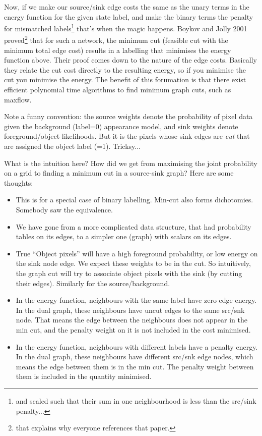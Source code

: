 \documentclass{article}
\begin{document}
Now, if we make our source/sink edge costs the same as the unary terms in the
energy function for the given state label, and make the binary terms the penalty
for mismatched labels\footnote{and scaled such that their sum in one
  neighbourhood is less than the src/sink penalty...} that's when the magic
happens.  Boykov and Jolly 2001 proved\footnote{that explains why everyone
  references that paper.} that for such a network, the minimum cut (feasible cut
with the minimum total edge cost) results in a labelling that minimises the
energy function above.  Their proof comes down to the nature of the edge costs.
Basically they relate the cut cost directly to the resulting energy, so if you
minimise the cut you minimise the energy.  The benefit of this forumation is
that there exist efficient polynomial time algorithms to find minimum graph
cuts, such as maxflow.

Note a funny convention: the source weights denote the probability of pixel data
given the background (label=0) appearance model, and sink weights denote
foreground/object likelihoods.  But it is the pixels whose sink edges are {\em
  cut} that are assigned the object label (=1).  Tricksy...

What is the intuition here?  How did we get from maximising the joint
probability on a grid to finding a minimum cut in a source-sink graph?  Here are
some thoughts:
\begin{itemize}
\item This is for a special case of binary labelling.  Min-cut also forms
  dichotomies.  Somebody saw the equivalence.
\item We have gone from a more complicated data structure, that had probability
  tables on its edges, to a simpler one (graph) with scalars on its edges.
\item True ``Object pixels'' will have a high foreground probability, or low
  energy on the sink node edge.  We expect these weights to be in the cut.  So
  intuitively, the graph cut will try to associate object pixels with the sink
  (by cutting their edges).  Similarly for the source/background.
\item In the energy function, neighbours with the same label have zero edge
  energy.  In the dual graph, these neighbours have uncut edges to the same
  src/snk node.  That means the edge between the neighbours does not appear in
  the min cut, and the penalty weight on it is not included in the cost
  minimised.
\item In the energy function, neighbours with different labels have a penalty
  energy.  In the dual graph, these neighbours have different src/snk edge
  nodes, which means the edge between them is in the min cut.  The penalty
  weight between them is included in the quantity minimised.
\end{itemize}
\end{document}
